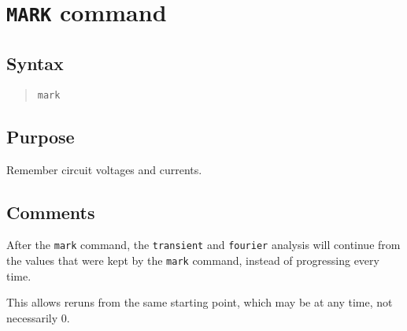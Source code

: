 %
%
%
%
\section{{\tt MARK} command}
\subsection{Syntax}
\begin{verse}
{\tt mark}
\end{verse}
\subsection{Purpose}

Remember circuit voltages and currents.
\subsection{Comments}

After the {\tt mark} command, the {\tt transient} and {\tt fourier} analysis
will continue from the values that were kept by the {\tt mark} command,
instead of progressing every time.

This allows reruns from the same starting point, which may be at any time,
not necessarily 0.
